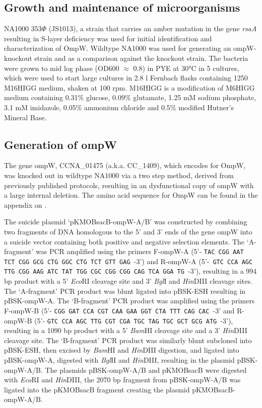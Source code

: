 \subsection{Growth and maintenance of microorganisms} 
\label{sub:porin_growth}
\caulobacter NA1000 353$\Phi$ (JS1013), a strain that carries an amber mutation in the gene \textit{rsaA} resulting in S-layer deficiency was used for initial identification and characterization of OmpW. Wildtype \caulobacter NA1000 was used for generating an ompW-knockout strain and as a comparison against the knockout strain. The bacteria were  grown to mid log phase (\ac{OD600} $\approx$ 0.8) in \ac{PYE} at 30\si{\degreeCelsius} in 5 \millilitre cultures, which were used to start large cultures in 2.8 \si{\litre} Fernbach flasks containing 1250 \millilitre M16HIGG medium, shaken at 100 rpm. M16HIGG is a modification of M6HIGG medium containing 0.31\% glucose, 0.09\% glutamate, 1.25 mM sodium phosphate, 3.1 mM imidazole, 0.05\% ammonium chloride and 0.5\% modified Hutner's Mineral Base.

\subsection{Generation of \caulobacter \del ompW}
\label{sub:porin_knockout}
The gene ompW, CCNA\_01475 (a.k.a. CC\_1409), which encodes for OmpW, was knocked out in wildtype \caulobacter NA1000 via a two step method, derived from previously published protocols, resulting in an dysfunctional copy of ompW with a large internal deletion. The amino acid sequence for OmpW can be found in the appendix on .

The suicide plasmid `pKMOBsacB-ompW-A/B' was constructed by combining two fragments of DNA homologous to the 5' and 3' ends of the gene ompW into a suicide vector containing both positive and negative selection elements. The `A-fragment' was \ac{PCR} amplified using the primers F-ompW-A (5'- \texttt{TAC CGG AAT TCT CGG GCG CTG GGC CTG TCT GTT GAG }-3') and R-ompW-A (5'-\texttt{ GTC CCA AGC TTG CGG AAG ATC TAT TGG CGC CGG CGG CAG TCA GGA TG }-3'), resulting in a 994 bp product with a 5' \textit{Eco}RI cleavage site and  3' \textit{Bgl}I and \textit{Hin}DIII cleavage sites.  The `A-fragment' \ac{PCR} product was blunt ligated into pBSK-ESH resulting in pBSK-ompW-A. The `B-fragment' PCR product was amplified using the primers F-ompW-B (5'- \texttt{CGG GAT CCA CGT CAA GAA GGT CTA TTT CAG CAC }-3' and R-ompW-B (5'- \texttt{GTC CCA AGC TTG CGT CGA TGC TAG TGC GCT GCG ATG }-3'), resulting in a 1090 bp product with a 5' \textit{Bam}HI cleavage site and a 3' \textit{Hin}DIII cleavage site. The `B-fragment' \ac{PCR} product was similarly blunt subcloned into pBSK-ESH, then excised by \textit{Bam}HI and \textit{Hin}DIII digestion, and ligated into pBSK-ompW-A, digested with \textit{Bgl}II and \textit{Hin}DIII, resulting in the plasmid pBSK-ompW-A/B. The plasmids pBSK-ompW-A/B and pKMOBsacB were digested with \textit{Eco}RI and \textit{Hin}DIII, the 2070 bp fragment from pBSK-ompW-A/B was ligated into the pKMOBsacB fragment creating the plasmid pKMOBsacB-ompW-A/B.


